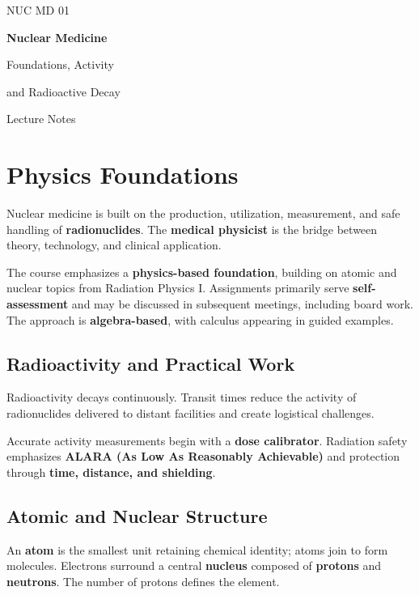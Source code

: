\documentclass[11pt,a4paper]{article}
\let\originalsection\section
\renewcommand{\section}{\Needspace{7\baselineskip}\originalsection}
\let\originalsubsection\subsection
\renewcommand{\subsection}{\Needspace{8\baselineskip}\originalsubsection}
\begin{document}
\hypersetup{pageanchor=false}
\begin{titlepage}
\vspace*{24mm}
{\color{teal}\large NUC MD 01\par}
\vspace{8mm}
{\color{navy}\Huge\bfseries Nuclear Medicine\par}
\vspace{6mm}
{\LARGE Foundations, Activity\par and Radioactive Decay\par}
\vspace{14mm}
{\large Lecture Notes\par}
\vfill
\end{titlepage}
\hypersetup{pageanchor=true}
{\small\tableofcontents}
\clearpage
\section{Physics Foundations}
Nuclear medicine is built on the production, utilization, measurement, and safe handling of \textbf{radionuclides}. The \textbf{medical physicist} is the bridge between theory, technology, and clinical application.

The course emphasizes a \textbf{physics-based foundation}, building on atomic and nuclear topics from Radiation Physics I. Assignments primarily serve \textbf{self-assessment} and may be discussed in subsequent meetings, including board work. The approach is \textbf{algebra-based}, with calculus appearing in guided examples.

\subsection{Radioactivity and Practical Work}
Radioactivity decays continuously. Transit times reduce the activity of radionuclides delivered to distant facilities and create logistical challenges.

Accurate activity measurements begin with a \textbf{dose calibrator}. Radiation safety emphasizes \textbf{ALARA (As Low As Reasonably Achievable)} and protection through \textbf{time, distance, and shielding}.

\subsection{Atomic and Nuclear Structure}

An \textbf{atom} is the smallest unit retaining chemical identity; atoms join to form molecules. Electrons surround a central \textbf{nucleus} composed of \textbf{protons} and \textbf{neutrons}. The number of protons defines the element.
\end{document}
